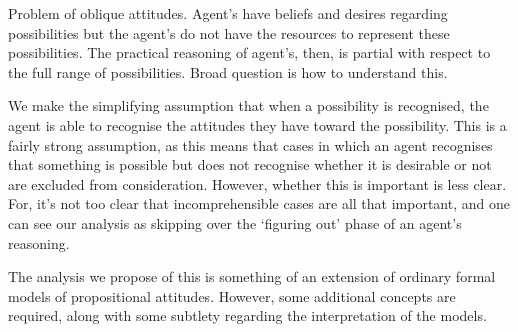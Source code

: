 \documentclass[10pt]{article}
\begin{document}
Problem of oblique attitudes.
Agent's have beliefs and desires regarding possibilities but the agent's do not have the resources to represent these possibilities.
The practical reasoning of agent's, then, is partial with respect to the full range of possibilities.
Broad question is how to understand this.

We make the simplifying assumption that when a possibility is recognised, the agent is able to recognise the attitudes they have toward the possibility.
This is a fairly strong assumption, as this means that cases in which an agent recognises that something is possible but does not recognise whether it is desirable or not are excluded from consideration.
However, whether this is important is less clear.
For, it's not too clear that incomprehensible cases are all that important, and one can see our analysis as skipping over the `figuring out' phase of an agent's reasoning.

The analysis we propose of this is something of an extension of ordinary formal models of propositional attitudes.
However, some additional concepts are required, along with some subtlety regarding the interpretation of the models.
\end{document}
